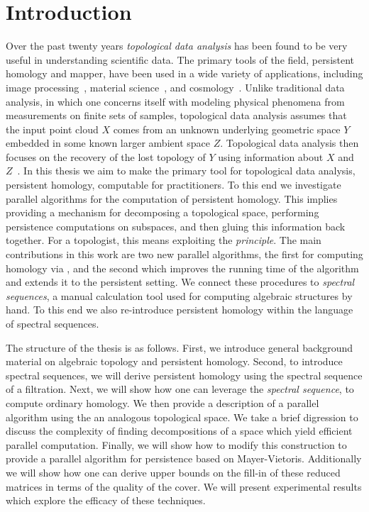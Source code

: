 \chapter{Introduction}
Over the past twenty years \emph{topological data analysis} has been found to be very useful in understanding scientific data. The primary tools of the field, persistent homology and mapper, have been used in a wide variety of applications, including image processing~\cite{cid-lbs-08}, material science~\cite{SW-measuring-shape}, and cosmology~\cite{cosmic-web}. Unlike traditional data analysis, in which one concerns itself with modeling physical phenomena from measurements on finite sets of samples, topological data analysis assumes that the input point cloud $X$ comes from an unknown underlying geometric space $Y$ embedded in some known larger ambient space $Z$. Topological data analysis then focuses on the recovery of the lost topology of $Y$ using information about $X$ and $Z$~\cite{c-tnd-09}. In this thesis we aim to make the primary tool for topological data analysis, persistent homology, computable for practitioners. To this end we investigate parallel algorithms for the computation of persistent homology. This implies providing a mechanism for decomposing a topological space, performing persistence computations on subspaces, and then gluing this information back together. For a topologist, this means exploiting the \emph{\mv principle}. The main contributions in this work are two new parallel algorithms, the first for computing homology via \mv{}, and the second which improves the running time of the algorithm and extends it to the persistent setting. We connect these procedures to \emph{spectral sequences}, a manual calculation tool used for computing algebraic structures by hand. To this end we also re-introduce persistent homology within the language of spectral sequences.

The structure of the thesis is as follows. First, we introduce general background material on algebraic topology and persistent homology. Second, to introduce spectral sequences, we will derive persistent homology using the spectral sequence of a filtration. Next, we will show how one can leverage the \emph{\mv spectral sequence}, to compute ordinary homology. We then provide a description of a parallel algorithm using the \mvb{} an analogous topological space. We take a brief digression to discuss the complexity of finding decompositions of a space which yield efficient parallel computation. Finally, we will show how to modify this construction to provide a parallel algorithm for persistence based on Mayer-Vietoris. Additionally we will show how one can derive upper bounds on the fill-in of these reduced matrices in terms of the quality of the cover. We will present experimental results which explore the efficacy of these techniques.

